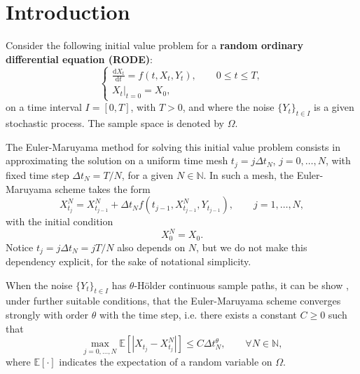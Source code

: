 \documentclass[reqno,12pt]{amsart}
\theoremstyle{plain}%
\theoremstyle{definition}
\begin{document}
\maketitle

\section{Introduction}

Consider the following initial value problem for a \textbf{random ordinary differential equation (RODE)}:
\begin{equation}
  \label{rodeeq}
  \begin{cases}
    \displaystyle \frac{\mathrm{d}X_t}{\mathrm{d} t} = f(t, X_t, Y_t), \qquad 0 \leq t \leq T, \\
    \left. X_t \right|_{t = 0} = X_0,
  \end{cases}
\end{equation}
on a time interval $I=[0, T]$, with $T > 0$, and where the noise $\{Y_t\}_{t\in I}$ is a given stochastic process. The sample space is denoted by $\Omega$.

The Euler-Maruyama method for solving this initial value problem consists in approximating the solution on a uniform time mesh $t_j = j\Delta t_N$, $j = 0, \ldots, N$, with fixed time step $\Delta t_N = T/N$, for a given $N\in \mathbb{N}$. In such a mesh, the Euler-Maruyama scheme takes the form
\begin{equation}
  \label{emscheme}
  X_{t_j}^N = X_{t_{j-1}}^N + \Delta t_N f(t_{j-1}, X_{t_{j-1}}^N, Y_{t_{j-1}}), \qquad j = 1, \ldots, N,
\end{equation}
with the initial condition
\begin{equation}
  \label{iccondition}
  X_0^N = X_0.
\end{equation}
Notice $t_j = j\Delta t_N = jT/N$ also depends on $N$, but we do not make this dependency explicit, for the sake of notational simplicity.

When the noise $\{Y_t\}_{t\in I}$ has $\theta$-H\"older continuous sample paths, it can be show \cite{GruneKloeden2001}, under further suitable conditions, that the Euler-Maruyama scheme converges strongly with order $\theta$ with the time step, i.e. there exists a constant $C \geq 0$ such that
\begin{equation}
    \label{strongordertheta}
    \max_{j=0, \ldots, N}\mathbb{E}\left[ \left| X_{t_j} - X_{t_j}^N \right| \right] \leq C \Delta t_N^\theta, \qquad \forall N \in \mathbb{N},
\end{equation}
where $\mathbb{E}[\cdot]$ indicates the expectation of a random variable on $\Omega$.
\end{document}
